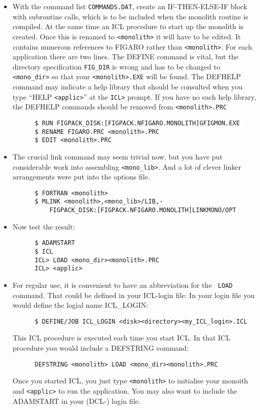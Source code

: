 \begin{itemize}
\item With the command list {\tt COMMANDS.DAT}, create an IF-THEN-ELSE-IF block
with subroutine calls, which is to be included when the monolith routine is
compiled. At the same time an ICL procedure to start up the monolith is
created. Once this is renamed to {\tt <monolith>} it will have to be edited. It
contains numerous references to FIGARO rather than {\tt <monolith>}. For each
application there are two lines. The DEFINE command is vital, but the directory
specification {\tt FIG\_DIR} is wrong and has to be changed to {\tt
<mono\_dir>} so that your {\tt <monolith>.EXE} will be found. The DEFHELP 
command may indicate a help library that should be consulted when you type
``HELP {\tt <applic>}'' at the {\tt ICL>} prompt. If you have no such help
library, the DEFHELP commands should be removed from {\tt <monolith>.PRC} 

\begin{verbatim} 
      $ RUN FIGPACK_DISK:[FIGPACK.NFIGARO.MONOLITH]GFIGMON.EXE 
      $ RENAME FIGARO.PRC <monolith>.PRC 
      $ EDIT <monolith>.PRC 
\end{verbatim} 

\item The crucial link
command may seem trivial now, but you have put considerable work into
assembling {\tt <mono\_lib>}. And a lot of clever linker arrangements were put
into the options file. 

\begin{verbatim} 
      $ FORTRAN <monolith>
      $ MLINK <monolith>,<mono_lib>/LIB,- 
          FIGPACK_DISK:[FIGPACK.NFIGARO.MONOLITH]LINKMONO/OPT
\end{verbatim}
 
\item Now test the result: 

\begin{verbatim} 
      $ ADAMSTART
      $ ICL
      ICL> LOAD <mono_dir><monolith>.PRC 
      ICL> <applic>
\end{verbatim}

\item For regular use, it is convenient to have an abbreviation for the {\tt
LOAD} command. That could be defined in your ICL-login file: In your login
file you would define the logial name ICL\_LOGIN:

\begin{verbatim} 
      $ DEFINE/JOB ICL_LOGIN <disk><directory><my_ICL_login>.ICL
\end{verbatim}

This ICL procedure is executed each time you start ICL. In that ICL procedure
you would include a DEFSTRING command:

\begin{verbatim} 
      DEFSTRING <monolith> LOAD <mono_dir><monolith>.PRC 
\end{verbatim}

Once you started ICL, you just type {\tt <monolith>} to initialise your monoith
and {\tt <applic>} to run the application. You may also want to include the
ADAMSTART in your (DCL-) login file.

\end{itemize} 

